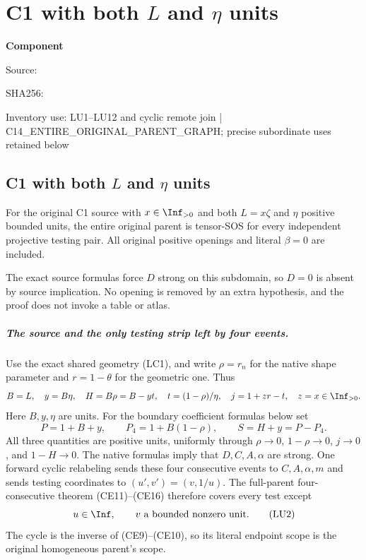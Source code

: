 \chapter{C1 with both $L$ and $\eta$ units}
\label{component:p686209b87229}
\noindent\textbf{Component }\par
{\small\noindent Source: \par}
{\small\noindent SHA256: \par}
{\small\noindent Inventory use: LU1--LU12 and cyclic remote join | C14\_\allowbreak{}ENTIRE\_\allowbreak{}ORIGINAL\_\allowbreak{}PARENT\_\allowbreak{}GRAPH; precise subordinate uses retained below\par}
\medskip
\section[C1 with both L and eta units]{C1 with both $L$ and $\eta$ units}
\label{p686209b87229:sec:r7-c1-L-eta-unit}

\begin{theorem}
For the original C1 source with $x\in\Inf_{>0}$ and both
$L=x\zeta$ and $\eta$ positive bounded units, the entire original
parent is tensor-SOS for every independent projective testing pair.
All original positive openings and literal $\beta=0$ are included.
\end{theorem}

The exact source formulas force $D$ strong on this subdomain, so
$D=0$ is absent by source implication.  No opening is removed by
an extra hypothesis, and the proof does not invoke a table or atlas.

\paragraph{The source and the only testing strip left by four events.}
Use the exact shared geometry (LC1), and write $\rho=r_n$ for the
native shape parameter and $r=1-\theta$ for the geometric one.
Thus
\[
 B=L,\quad y=B\eta,\quad H=B\rho=B-yt,\quad
 t=(1-\rho)/\eta,\quad j=1+zr-t,
 \quad z=x\in\Inf_{>0}.
\]
Here $B,y,\eta$ are units.  For the boundary coefficient formulas
below set
\[
 P=1+B+y,\qquad P_4=1+B(1-\rho),\qquad S=H+y=P-P_4.
                                                               \tag{LU1}
\]
All three quantities are positive units, uniformly through
$\rho\to0$, $1-\rho\to0$, $j\to0$, and $1-H\to0$.
The native formulas imply that $D,C,A,\alpha$ are strong.
One forward cyclic relabeling sends these four consecutive events
to $C,A,\alpha,m$ and sends testing coordinates to
$(u',v')=(v,1/u)$.  The full-parent four-consecutive theorem
(CE11)--(CE16) therefore covers every test except
\[
                    u\in\Inf,\qquad v\text{ a bounded nonzero unit}.
                                                               \tag{LU2}
\]
The cycle is the inverse of (CE9)--(CE10), so its literal endpoint
scope is the original homogeneous parent's scope.

